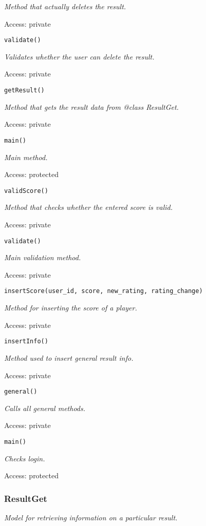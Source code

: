 {\scriptsize
\textit{Method that actually deletes the result.}

Access: private

}

\texttt{validate()}

{\scriptsize
\textit{Validates whether the user can delete the result.}

Access: private

}

\texttt{getResult()}

{\scriptsize
\textit{Method that gets the result data from @class ResultGet.}

Access: private

}

\texttt{main()}

{\scriptsize
\textit{Main method.}

Access: protected

}

\texttt{validScore()}

{\scriptsize
\textit{Method that checks whether the entered score is valid.}

Access: private

}

\texttt{validate()}

{\scriptsize
\textit{Main validation method.}

Access: private

}

\texttt{insertScore(user\_id, score, new\_rating, rating\_change)}

{\scriptsize
\textit{Method for inserting the score of a player.}

Access: private

}

\texttt{insertInfo()}

{\scriptsize
\textit{Method used to insert general result info.}

Access: private

}

\texttt{general()}

{\scriptsize
\textit{Calls all general methods.}

Access: private

}

\texttt{main()}

{\scriptsize
\textit{Checks login.}

Access: protected

}

\subsubsection{ResultGet}
\textit{Model for retrieving information on a particular result.}

